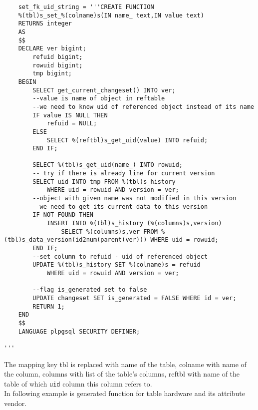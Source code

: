 \documentclass[deska]{subfiles}
\begin{document}
\begin{verbatim}
    set_fk_uid_string = '''CREATE FUNCTION
    %(tbl)s_set_%(colname)s(IN name_ text,IN value text)
    RETURNS integer
    AS
    $$
    DECLARE ver bigint;
        refuid bigint;
        rowuid bigint;
        tmp bigint;
    BEGIN
        SELECT get_current_changeset() INTO ver;
        --value is name of object in reftable
        --we need to know uid of referenced object instead of its name
        IF value IS NULL THEN
            refuid = NULL;
        ELSE
            SELECT %(reftbl)s_get_uid(value) INTO refuid;
        END IF;

        SELECT %(tbl)s_get_uid(name_) INTO rowuid;
        -- try if there is already line for current version
        SELECT uid INTO tmp FROM %(tbl)s_history
            WHERE uid = rowuid AND version = ver;
        --object with given name was not modified in this version
        --we need to get its current data to this version
        IF NOT FOUND THEN
            INSERT INTO %(tbl)s_history (%(columns)s,version)
                SELECT %(columns)s,ver FROM %(tbl)s_data_version(id2num(parent(ver))) WHERE uid = rowuid;
        END IF;
        --set column to refuid - uid of referenced object
        UPDATE %(tbl)s_history SET %(colname)s = refuid
            WHERE uid = rowuid AND version = ver;

        --flag is_generated set to false
        UPDATE changeset SET is_generated = FALSE WHERE id = ver;
        RETURN 1;
    END
    $$
    LANGUAGE plpgsql SECURITY DEFINER;

'''
\end{verbatim}

The mapping key tbl is replaced with name of the table, colname with name of the column, columns with list of the table's columns, reftbl with name of the table of which {\tt uid} column this column refers to.\\
In following example is generated function for table hardware and its attribute vendor.
\end{document}

